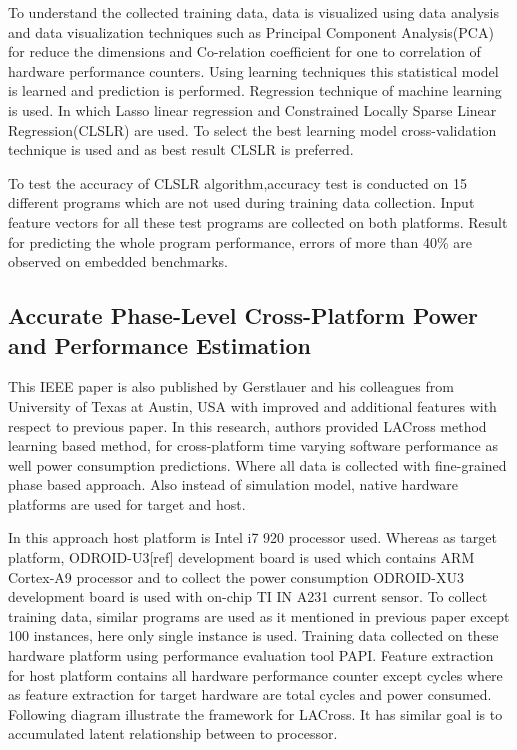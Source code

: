 \par To understand the collected training data, data is visualized using data analysis and data visualization techniques such as Principal Component Analysis(PCA) for reduce the dimensions and Co-relation coefficient for one to correlation of hardware performance counters. Using learning techniques this statistical model is learned and prediction is performed. Regression technique of machine learning is used. In which Lasso linear regression and Constrained Locally Sparse Linear Regression(CLSLR) are used. To select the best learning model cross-validation technique is used and as best result CLSLR is preferred. 

\par To test the accuracy of CLSLR algorithm,accuracy test is conducted on 15 different programs which are not used during training data collection. Input feature vectors for all these test programs are collected on both platforms. Result for predicting the whole program performance, errors of more than 40\% are observed on embedded benchmarks. 

\subsection{Accurate Phase-Level Cross-Platform Power and Performance Estimation}
This IEEE paper is also published by Gerstlauer and his colleagues from University of Texas at Austin, USA with improved and additional features with respect to previous paper. In this research, authors provided LACross method learning based method, for cross-platform time varying software performance as well power consumption predictions. Where all data is collected with fine-grained phase based approach. Also instead of simulation model, native hardware platforms are used for target and host.

\par In this approach host platform is Intel i7 920 processor used. Whereas as target platform, ODROID-U3[ref] development board is used which contains ARM Cortex-A9 processor and to collect the power consumption ODROID-XU3 development board is used with on-chip TI IN A231 current sensor. To collect training data, similar programs are used as it mentioned in previous paper except 100 instances, here only single instance is used. Training data collected on these hardware platform using performance evaluation tool PAPI. Feature extraction for host platform contains all hardware performance counter except cycles where as feature extraction for target hardware are total cycles and power consumed. Following diagram illustrate the framework for LACross. It has similar goal is to accumulated latent relationship between to processor.

